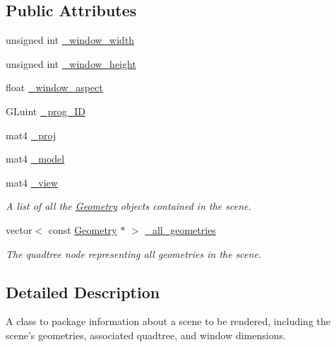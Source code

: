 \subsection*{Public Attributes}
\begin{DoxyCompactItemize}
\item 
unsigned int \hyperlink{class_scene_a9857688fb9c3a52be5e6b7551d7e3af8}{\+\_\+window\+\_\+width}
\item 
unsigned int \hyperlink{class_scene_a4a9a7b4b69981efd9ffddfb7d4205806}{\+\_\+window\+\_\+height}
\item 
float \hyperlink{class_scene_aa5d5f322f50e6518e88501fa5481eca9}{\+\_\+window\+\_\+aspect}
\item 
G\+Luint \hyperlink{class_scene_a30e431c913372130cd9f97c0c1e3d75e}{\+\_\+prog\+\_\+\+I\+D}
\item 
mat4 \hyperlink{class_scene_a7e980fe501bcaf6f173497d0a2190887}{\+\_\+proj}
\item 
mat4 \hyperlink{class_scene_a2eea7478321942ad8f26f4555e1202c9}{\+\_\+model}
\item 
mat4 \hyperlink{class_scene_ae1b9af3642d66e6eff7d849c20aafdc5}{\+\_\+view}
\begin{DoxyCompactList}\small\item\em A list of all the \hyperlink{class_geometry}{Geometry} objects contained in the scene. \end{DoxyCompactList}\item 
vector$<$ const \hyperlink{class_geometry}{Geometry} $\ast$ $>$ \hyperlink{class_scene_ae4e39aee440d748c4dc14a5aad13825d}{\+\_\+all\+\_\+geometries}
\begin{DoxyCompactList}\small\item\em The quadtree node representing all geometries in the scene. \end{DoxyCompactList}\end{DoxyCompactItemize}


\subsection{Detailed Description}
A class to package information about a scene to be rendered, including the scene's geometries, associated quadtree, and window dimensions. 

